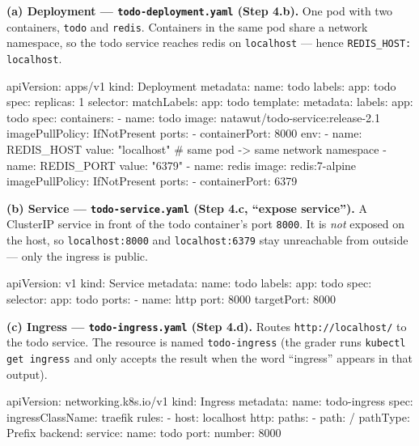 \documentclass[a4paper, 10pt]{article}
\begin{document}
\begin{solution}
	\textbf{(a) Deployment --- \texttt{todo-deployment.yaml} (Step 4.b).}
	One pod with two containers, \texttt{todo} and \texttt{redis}. Containers in the
	same pod share a network namespace, so the todo service reaches redis on
	\texttt{localhost} --- hence \texttt{REDIS\_HOST: localhost}.
	\begin{codingbox*}[language=YAML]
apiVersion: apps/v1
kind: Deployment
metadata:
  name: todo
  labels:
    app: todo
spec:
  replicas: 1
  selector:
    matchLabels:
      app: todo
  template:
    metadata:
      labels:
        app: todo
    spec:
      containers:
        - name: todo
          image: natawut/todo-service:release-2.1
          imagePullPolicy: IfNotPresent
          ports:
            - containerPort: 8000
          env:
            - name: REDIS_HOST
              value: "localhost"      # same pod -> same network namespace
            - name: REDIS_PORT
              value: "6379"
        - name: redis
          image: redis:7-alpine
          imagePullPolicy: IfNotPresent
          ports:
            - containerPort: 6379
	\end{codingbox*}

	\textbf{(b) Service --- \texttt{todo-service.yaml} (Step 4.c, ``expose service'').}
	A ClusterIP service in front of the todo container's port \texttt{8000}. It is
	\emph{not} exposed on the host, so \texttt{localhost:8000} and \texttt{localhost:6379}
	stay unreachable from outside --- only the ingress is public.
	\begin{codingbox*}[language=YAML]
apiVersion: v1
kind: Service
metadata:
  name: todo
  labels:
    app: todo
spec:
  selector:
    app: todo
  ports:
    - name: http
      port: 8000
      targetPort: 8000
	\end{codingbox*}

	\textbf{(c) Ingress --- \texttt{todo-ingress.yaml} (Step 4.d).}
	Routes \texttt{http://localhost/} to the todo service. The resource is named
	\texttt{todo-ingress} (the grader runs \texttt{kubectl get ingress} and only
	accepts the result when the word ``ingress'' appears in that output).
	\begin{codingbox*}[language=YAML]
apiVersion: networking.k8s.io/v1
kind: Ingress
metadata:
  name: todo-ingress
spec:
  ingressClassName: traefik
  rules:
    - host: localhost
      http:
        paths:
          - path: /
            pathType: Prefix
            backend:
              service:
                name: todo
                port:
                  number: 8000
	\end{codingbox*}
\end{solution}
\end{document}
